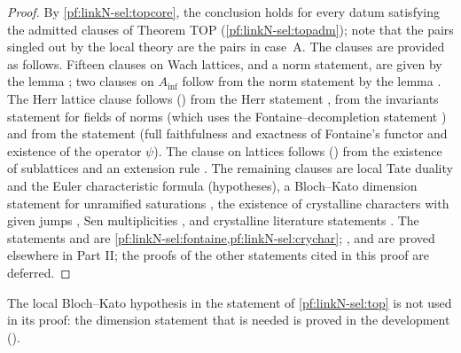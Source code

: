 \begin{proof}
By \cref{pf:linkN-sel:topcore}, the conclusion holds for every datum satisfying the admitted clauses of Theorem TOP
(\cref{pf:linkN-sel:topadm}); note that the pairs singled out by the local theory are the pairs in case~A. The clauses are provided as follows. Fifteen clauses on Wach lattices, and a norm statement, are given by the lemma
; two clauses on $A_{\inf}$ follow from the norm statement by the lemma
. The Herr lattice clause follows
() from the Herr statement
, from the invariants statement for fields of norms
 (which uses the Fontaine--decompletion statement
) and from the statement
 (full faithfulness and exactness of Fontaine's functor and existence of the
operator $\psi$). The clause on lattices follows () from the
existence of sublattices  and an extension rule
. The remaining clauses are local Tate duality and the Euler characteristic formula (hypotheses),
a Bloch--Kato dimension statement for unramified saturations ,
the existence of crystalline characters with given jumps , Sen
multiplicities , and crystalline literature statements .
The statements  and
 are \cref{pf:linkN-sel:fontaine,pf:linkN-sel:crychar};
,  and
 are proved elsewhere in Part II; the proofs of the other statements cited in this
proof are deferred.
\end{proof}

\begin{remark}\label{pf:linkN-sel:topremark}
The local Bloch--Kato hypothesis in the statement of \cref{pf:linkN-sel:top} is not used in its proof: the dimension statement that is needed is
proved in the development ().
\end{remark}

